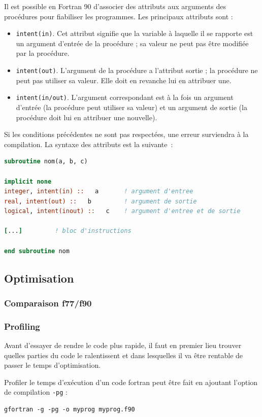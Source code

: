 \documentclass[a4paper,twoside]{article}
\begin{document}
Il est possible en Fortran 90 d'associer des attributs aux arguments des procédures pour fiabiliser les programmes. Les principaux attributs sont : 
\begin{itemize}
\item  \texttt{intent(in)}. Cet attribut signifie que la variable à laquelle il se rapporte est un argument d'entrée de la procédure ; sa valeur ne peut pas être modifiée par la procédure. 

\item  \texttt{intent(out)}. L'argument de la procédure a l'attribut sortie ; la procédure ne peut pas utiliser sa valeur. Elle doit en revanche lui en attribuer une.

\item  \texttt{intent(in/out)}. L'argument correspondant est à la fois un argument d'entrée (la procédure peut utiliser sa valeur) et un argument de sortie (la procédure doit lui en attribuer une nouvelle). 
\end{itemize}
Si les conditions précédentes ne sont pas respectées, une erreur surviendra à la compilation. La syntaxe des attributs est la suivante~: 
\begin{lstlisting}[language=Fortran]
subroutine nom(a, b, c)
 
implicit none         
integer, intent(in) ::   a       ! argument d'entree 
real, intent(out) ::   b         ! argument de sortie 
logical, intent(inout) ::   c    ! argument d'entree et de sortie
 
[...]         ! bloc d'instructions
 
end subroutine nom 
\end{lstlisting}


\subsection{Optimisation}
\subsubsection{Comparaison f77/f90}
\subsubsection{Profiling}
Avant d'essayer de rendre le code plus rapide, il faut en premier lieu trouver quelles parties du code le ralentissent et dans lesquelles il va être rentable de passer le temps d'optimisation.

Profiler le temps d'exécution d'un code fortran peut être fait en ajoutant l'option de compilation \texttt{-pg} : 
\begin{verbatim}
gfortran -g -pg -o myprog myprog.f90
\end{verbatim}
\end{document}
